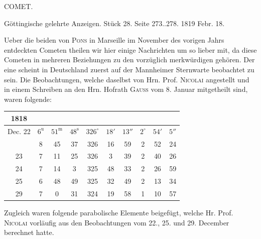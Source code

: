 \clearpage
{}
\begin{center}
\Large COMET.

\medskip
Göttingische gelehrte Anzeigen. Stück 28. Seite 273..278. 1819 Febr. 18.
\end{center}

\par\indent Ueber die beiden von \textsc{Pons} in Marseille im November des vorigen Jahrs entdeckten
Cometen theilen wir hier einige Nachrichten um so lieber mit, da diese Cometen in
mehreren Beziehungen zu den vorzüglich merkwürdigen gehören. Der eine scheint in
Deutschland zuerst auf der Mannheimer Sternwarte beobachtet zu sein. Die
Beobachtungen, welche daselbst von Hrn. Prof. \textsc{Nicolai} angestellt und in einem
Schreiben an den Hrn. Hofrath \textsc{Gauss} vom 8. Januar mitgetheilt sind, waren folgende:

\begin{center}
\setlength{\tabcolsep}{2.2pt}\begin{tabular}{c|ccc|ccc|ccc}
1818 &  &  &  \\
\hline
Dec. 22 & $6^{\mathrm u}$ & $51^{\mathrm m}$ & $48^{\mathrm s}$ & $326^\circ$ & $18'$ & $13''$ & $2^\circ$ & $54'$ & $5''$ \\
        & 8     & 45     & 37     & 326         & 16    & 59     & 2         & 52    & 24    \\
     23 & 7     & 11     & 25     & 326         & 3     & 39     & 2         & 40    & 26    \\
     24 & 7     & 14     & 3      & 325         & 48    & 33     & 2         & 26    & 59    \\
     25 & 6     & 48     & 49     & 325         & 32    & 49     & 2         & 13    & 34    \\
     29 & 7     & 0      & 31     & 324         & 19    & 58     & 1         & 10    & 57    \\
\end{tabular}
\end{center}

\par\indent Zugleich waren folgende parabolische Elemente beigefügt, welche Hr. Prof. \textsc{Nicolai}
vorläufig aus den Beobachtungen vom 22., 25. und 29. December berechnet hatte.

